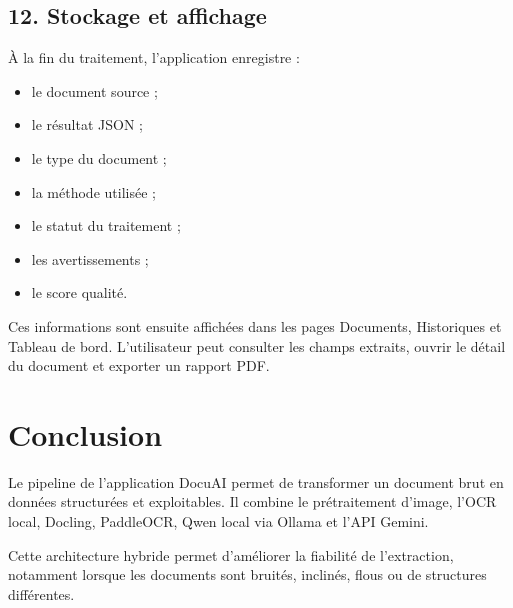 \documentclass[12pt,a4paper]{report}
\begin{document}
\subsection*{12. Stockage et affichage}

À la fin du traitement, l'application enregistre :

\begin{itemize}
    \item le document source ;
    \item le résultat JSON ;
    \item le type du document ;
    \item la méthode utilisée ;
    \item le statut du traitement ;
    \item les avertissements ;
    \item le score qualité.
\end{itemize}

Ces informations sont ensuite affichées dans les pages Documents, Historiques et Tableau de bord. L'utilisateur peut consulter les champs extraits, ouvrir le détail du document et exporter un rapport PDF.

\section*{Conclusion}

Le pipeline de l'application DocuAI permet de transformer un document brut en données structurées et exploitables. Il combine le prétraitement d'image, l'OCR local, Docling, PaddleOCR, Qwen local via Ollama et l'API Gemini.

Cette architecture hybride permet d'améliorer la fiabilité de l'extraction, notamment lorsque les documents sont bruités, inclinés, flous ou de structures différentes.
\end{document}
